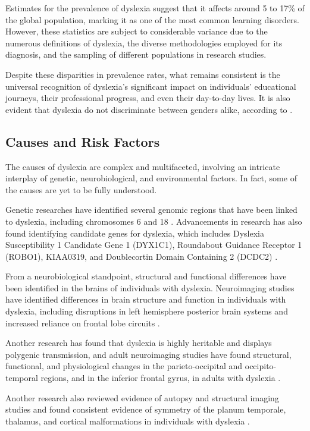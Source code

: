 Estimates for the prevalence of dyslexia suggest that it affects around 5 to 17\% \parencite{Ramli2020} of the global population, marking it as one of the most common learning disorders. However, these statistics are subject to considerable variance due to the numerous definitions of dyslexia, the diverse methodologies employed for its diagnosis, and the sampling of different populations in research studies.

Despite these disparities in prevalence rates, what remains consistent is the universal recognition of dyslexia's significant impact on individuals' educational journeys, their professional progress, and even their day-to-day lives. It is also evident that dyslexia do not discriminate between genders alike, according to \textcite{Guerin1993DyslexicSA}.


\subsection{Causes and Risk Factors}
The causes of dyslexia are complex and multifaceted, involving an intricate interplay of genetic, neurobiological, and environmental factors. In fact, some of the causes are yet to be fully understood. 

Genetic researches have identified several genomic regions that have been linked to dyslexia, including chromosomes 6 and 18 \parencite{Francks2002, Schumacher2007}. Advancements in research has also found identifying candidate genes for dyslexia, which includes Dyslexia Susceptibility 1 Candidate Gene 1 (DYX1C1), Roundabout Guidance Receptor 1 (ROBO1), KIAA0319, and Doublecortin Domain Containing 2 (DCDC2) \parencite{Paracchini2007}. 

From a neurobiological standpoint, structural and functional differences have been identified in the brains of individuals with dyslexia. Neuroimaging studies have identified differences in brain structure and function in individuals with dyslexia, including disruptions in left hemisphere posterior brain systems and increased reliance on frontal lobe circuits \parencite{Kearns2019, Norton2015}.

Another research has found that dyslexia is highly heritable and displays polygenic transmission, and adult neuroimaging studies have found structural, functional, and physiological changes in the parieto-occipital and occipito-temporal regions, and in the inferior frontal gyrus, in adults with dyslexia \parencite{SorianoFerrer2017}. 

Another research also reviewed evidence of autopsy and structural imaging studies and found consistent evidence of symmetry of the planum temporale, thalamus, and cortical malformations in individuals with dyslexia \parencite{Wajuihian2011}.

